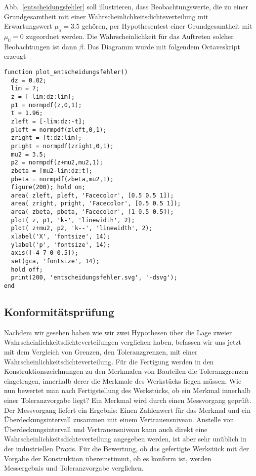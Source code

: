 Abb.~\ref{entscheidungsfehler} soll illustrieren, dass Beobachtungswerte, die zu einer
Grundgesamtheit mit einer Wahrscheinlichkeitsdichteverteilung mit Erwartungswert
$\mu_\mathrm{a} = 3.5$ gehören, per Hypothesentest einer Grundgesamtheit mit $\mu_0 = 0$
zugeordnet werden. Die Wahrscheinlichkeit für das Auftreten solcher Beobachtungen ist
dann $\beta$. Das Diagramm wurde mit folgendem Octaveskript erzeugt

\begin{lstlisting}[style=Matlab]
function plot_entscheidungsfehler()
  dz = 0.02;
  lim = 7;
  z = [-lim:dz:lim];
  p1 = normpdf(z,0,1);
  t = 1.96;
  zleft = [-lim:dz:-t];
  pleft = normpdf(zleft,0,1);
  zright = [t:dz:lim];
  pright = normpdf(zright,0,1);
  mu2 = 3.5;
  p2 = normpdf(z+mu2,mu2,1);
  zbeta = [mu2-lim:dz:t];
  pbeta = normpdf(zbeta,mu2,1);
  figure(200); hold on;
  area( zleft, pleft, 'Facecolor', [0.5 0.5 1]);
  area( zright, pright, 'Facecolor', [0.5 0.5 1]);
  area( zbeta, pbeta, 'Facecolor', [1 0.5 0.5]);
  plot( z, p1, 'k-', 'linewidth', 2);
  plot( z+mu2, p2, 'k--', 'linewidth', 2);
  xlabel('X', 'fontsize', 14);
  ylabel('p', 'fontsize', 14);
  axis([-4 7 0 0.5]);
  set(gca, 'fontsize', 14);
  hold off;
  print(200, 'entscheidungsfehler.svg', '-dsvg');
end
\end{lstlisting}

\subsection{Konformitätsprüfung}
Nachdem wir gesehen haben wie wir zwei Hypothesen über die Lage zweier Wahrscheinlich\-keits\-dichte\-ver\-teilungen
verglichen haben, befassen wir uns jetzt mit dem Vergleich von Grenzen, den Toleranzgrenzen, mit einer
Wahrscheinlichkeitsdichteverteilung. Für die Fertigung werden in den Konstruktionszeichnungen zu den Merkmalen
von Bauteilen die Toleranzgrenzen eingetragen, innerhalb derer die Merkmale des Werkstücks liegen müssen. Wie nun
bewertet man nach Fertigstellung des Werkstücks, ob ein Merkmal innerhalb einer Toleranzvorgabe liegt? Ein Merkmal
wird durch einen Messvorgang geprüft. Der Messvorgang liefert ein Ergebnis: Einen Zahlenwert für das Merkmal und
ein Überdeckungsintervall zusammen mit einem Vertrauensniveau. Anstelle von Überdeckungsintervall und Vertrauensniveau
kann auch direkt eine Wahrscheinlichkeitsdichteverteilung angegeben werden, ist aber sehr unüblich in der industriellen
Praxis. Für die Bewertung, ob das gefertigte Werkstück mit der Vorgabe der Konstruktion übereinstimmt, ob es konform ist,
werden Messergebnis und Toleranzvorgabe verglichen.

